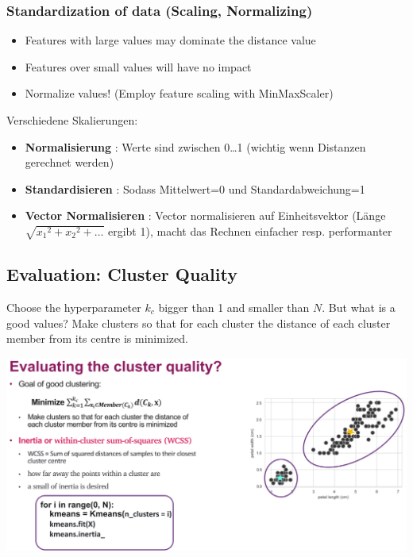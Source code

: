 \subsubsection{Standardization of data (Scaling, Normalizing)}
\begin{itemize}
    \item Features with large values may dominate the distance value
    \item Features over small values will have no impact
    \item Normalize values! (Employ feature scaling with MinMaxScaler)
\end{itemize}
Verschiedene Skalierungen:
\begin{itemize}
    \item \textbf{Normalisierung} : Werte sind zwischen 0\dots1 (wichtig wenn Distanzen gerechnet werden)
    \item \textbf{Standardisieren} : Sodass Mittelwert=0 und Standardabweichung=1
    \item \textbf{Vector Normalisieren} : Vector normalisieren auf Einheitsvektor (Länge $\sqrt{{x_1}^2 + {x_2}^2 + \dots}$ ergibt 1), macht das Rechnen einfacher resp. performanter
\end{itemize}

\subsection{Evaluation: Cluster Quality}
Choose the hyperparameter $k_c$ bigger than 1 and smaller than $N$. But what is a good values? Make clusters so that for each cluster the distance of each cluster member from its centre is minimized.

\includegraphics[width=\linewidth]{./img/w12_clusterquality.png}
